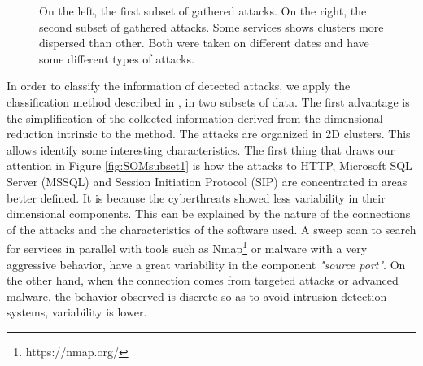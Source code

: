 \documentclass[a4paper]{llncs}
\begin{document}
\begin{figure}[h]
	\caption{On the left, the first subset of gathered attacks. On the right, the second subset of gathered attacks. Some services shows clusters more dispersed than other. Both  were taken on different dates and have some different types of attacks.\label{fig:SOMsubset1}\label{fig:SOMsubset2}}
\end{figure}

In order to classify the information of detected attacks, we apply the classification method described in \cite{panda-2009}, in two subsets of data. The first advantage is the simplification of the collected information derived from the dimensional reduction intrinsic to the method. The attacks are organized in 2D clusters.  This allows identify some interesting characteristics. The first thing that draws our attention in Figure \ref{fig:SOMsubset1} is how the attacks to HTTP, Microsoft SQL Server (MSSQL) and Session Initiation Protocol (SIP) are concentrated in areas better defined. It is because the cyberthreats showed less variability in their dimensional components. This can be explained by the nature of the connections of the attacks and the characteristics of the software used. A sweep scan to search for services in parallel with tools such as Nmap\footnote{https://nmap.org/} or malware with a very aggressive behavior, have a great variability in the component {\it"source port"}. On the other hand, when the connection comes from targeted attacks or advanced malware, the behavior observed is discrete so as to avoid intrusion detection systems, variability is lower.
\end{document}
